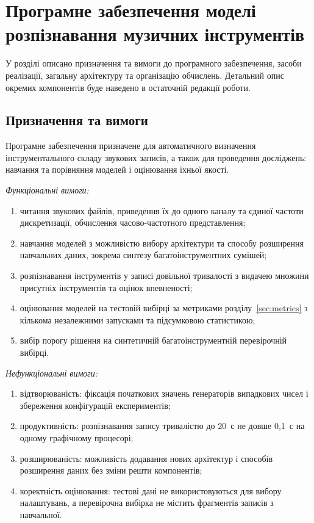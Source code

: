 
\chapter{Програмне забезпечення моделі розпізнавання музичних інструментів}
\label{chap:software}

У розділі описано призначення та вимоги до програмного забезпечення,
засоби реалізації, загальну архітектуру та організацію обчислень.
Детальний опис окремих компонентів буде наведено в остаточній редакції
роботи.

\section{Призначення та вимоги}
\label{sec:sw_req}

Програмне забезпечення призначене для автоматичного визначення
інструментального складу звукових записів, а також для проведення
досліджень: навчання та порівняння моделей і оцінювання їхньої якості.

\textit{Функціональні вимоги:}
\begin{enumerate}
    \item читання звукових файлів, приведення їх до одного каналу та
    єдиної частоти дискретизації, обчислення часово-частотного
    представлення;
    \item навчання моделей з можливістю вибору архітектури та способу
    розширення навчальних даних, зокрема синтезу багатоінструментних
    сумішей;
    \item розпізнавання інструментів у записі довільної тривалості з
    видачею множини присутніх інструментів та оцінок впевненості;
    \item оцінювання моделей на тестовій вибірці за метриками
    розділу~\ref{sec:metrics} з кількома незалежними запусками та
    підсумковою статистикою;
    \item вибір порогу рішення на синтетичній багатоінструментній
    перевірочній вибірці.
\end{enumerate}

\textit{Нефункціональні вимоги:}
\begin{enumerate}
    \item відтворюваність: фіксація початкових значень генераторів
    випадкових чисел і збереження конфігурацій експериментів;
    \item продуктивність: розпізнавання запису тривалістю до 20~с не довше
    0,1~с на одному графічному процесорі;
    \item розширюваність: можливість додавання нових архітектур і способів
    розширення даних без зміни решти компонентів;
    \item коректність оцінювання: тестові дані не використовуються для
    вибору налаштувань, а перевірочна вибірка не містить фрагментів
    записів з навчальної.
\end{enumerate}

